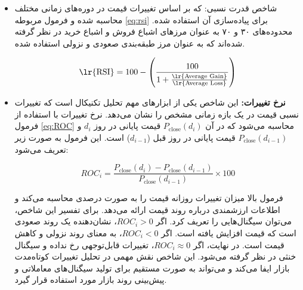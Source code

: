 \begin{itemize}
\begin{itemize}
    \item شاخص قدرت نسبی: که بر اساس تغییرات قیمت در دوره‌های زمانی مختلف محاسبه شده و فرمول مربوطه \ref{eq:rsi} برای پیاده‌سازی آن استفاده شده. محدوده‌های ۳۰ و ۷۰ به عنوان مرزهای اشباع فروش و اشباع خرید در نظر گرفته شده‌اند که به عنوان مرز طبقه‌بندی صعودی و نزولی استفاده شده.

\begin{equation} \label{eq:rsi} \text{\lr{RSI}} = 100 - \left( \frac{100}{1 + \frac{\text{\lr{Average Gain}}}{\text{\lr{Average Loss}}}} \right) \end{equation}

    \item \textbf{نرخ تغییرات:} این شاخص یکی از ابزارهای مهم تحلیل تکنیکال است که تغییرات نسبی قیمت در یک بازه زمانی مشخص را نشان می‌دهد. نرخ تغییرات با استفاده از فرمول \ref{eq:ROC} محاسبه می‌شود که در آن \( P_{\text{close}}(d_i) \) قیمت پایانی در روز \( d_i \) و \( P_{\text{close}}(d_{i-1}) \) قیمت پایانی در روز قبل (\( d_{i-1} \)) است. این فرمول به صورت زیر تعریف می‌شود:

\begin{equation} \label{eq:ROC}
ROC_i = \frac{P_{\text{close}}(d_i) - P_{\text{close}}(d_{i-1})}{P_{\text{close}}(d_{i-1})} \times 100 
\end{equation}

فرمول بالا میزان تغییرات روزانه قیمت را به صورت درصدی محاسبه می‌کند و اطلاعات ارزشمندی درباره روند قیمت ارائه می‌دهد. برای تفسیر این شاخص، می‌توان سیگنال‌هایی را تعریف کرد. اگر \( ROC_i > 0 \)، نشان‌دهنده یک روند صعودی است که قیمت افزایش یافته است. اگر \( ROC_i < 0 \)، به معنای روند نزولی و کاهش قیمت است. در نهایت، اگر \( ROC_i \approx 0 \)، تغییرات قابل‌توجهی رخ نداده و سیگنال خنثی در نظر گرفته می‌شود. این شاخص نقش مهمی در تحلیل تغییرات کوتاه‌مدت بازار ایفا می‌کند و می‌تواند به صورت مستقیم برای تولید سیگنال‌های معاملاتی و پیش‌بینی روند بازار مورد استفاده قرار گیرد.

\end{itemize}
\end{itemize}

